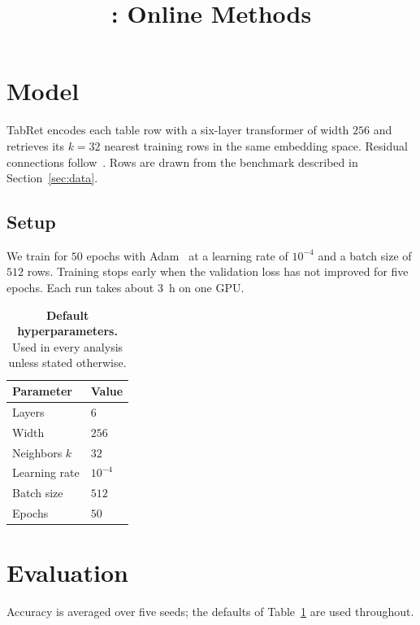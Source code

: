 \documentclass[10pt]{article}
\title{\model{}: Online Methods}
\author{}
\date{}
\newcommand{\model}{TabRet}
\begin{document}
\maketitle

\section{Model}\label{sec:model}
\model{} encodes each table row with a six-layer transformer of width $256$
and retrieves its $k=32$ nearest training rows in the same embedding space.
Residual connections follow~\citep{he2016resnet}. Rows are drawn from the
benchmark described in Section~\ref{sec:data}.

\subsection{Setup}\label{sec:setup}
We train for $50$ epochs with Adam~\citep{kingma2015adam} at a learning rate of
$10^{-4}$ and a batch size of $512$ rows. Training stops early when the
validation loss has not improved for five epochs. Each run takes about
\SI{3}{\hour} on one GPU.

\begin{table}[h]
  \caption{\textbf{Default hyperparameters.} Used in every analysis unless stated otherwise.}\label{tab:defaults}
  \centering
  \begin{tabular}{@{}ll@{}}
  \toprule
  Parameter & Value \\
  \midrule
  Layers & $6$ \\
  Width & $256$ \\
  Neighbors $k$ & $32$ \\
  Learning rate & $10^{-4}$ \\
  Batch size & $512$ \\
  Epochs & $50$ \\
  \bottomrule
  \end{tabular}
\end{table}

\section{Evaluation}\label{sec:eval}
Accuracy is averaged over five seeds; the defaults of Table~\ref{tab:defaults}
are used throughout.



\end{document}
